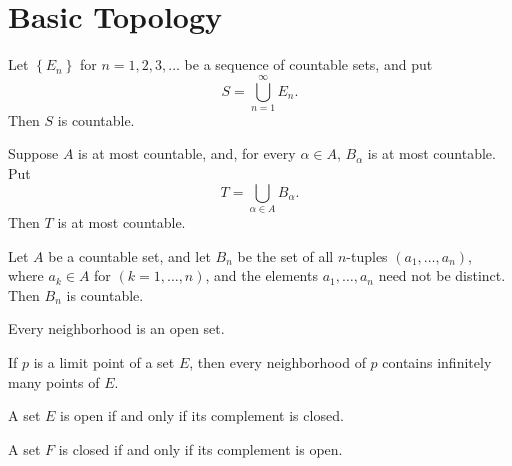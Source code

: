 \chapter{Basic Topology}

\setcounter{theorem}{11}
\begin{theorem}
	\label{theorem-2.12}
	Let $\left\lbrace E_n \right\rbrace$ for $n = 1, 2, 3, \ldots$ be a sequence of countable sets, and put
	\begin{equation}
	S = \bigcup_{n=1}^\infty E_n.
	\end{equation}
	Then $S$ is countable.
\end{theorem}

\begin{corollary}
	\label{theorem-2.12-corollary-1}
	Suppose $A$ is at most countable, and, for every $\alpha \in A$, $B_\alpha$ is at most countable. Put
	\begin{equation*}
	T = \bigcup_{\alpha \in A} B_\alpha.
	\end{equation*}
	Then $T$ is at most countable.
\end{corollary}

\begin{theorem}
	\label{theorem-2.13}
	Let $A$ be a countable set, and let $B_n$ be the set of all $n$-tuples $\left( a_1, \ldots, a_n \right)$, where $a_k \in A$ for $\left( k = 1, \ldots, n \right)$, and the elements $a_1, \ldots, a_n$ need not be distinct. Then $B_n$ is countable.
\end{theorem}

\setcounter{theorem}{18}
\begin{theorem}
	\label{theorem-2.19}
	Every neighborhood is an open set.
\end{theorem}

\begin{theorem}
	\label{theorem-2.20}
	If $p$ is a limit point of a set $E$, then every neighborhood of $p$ contains infinitely many points of $E$.
\end{theorem}

\setcounter{theorem}{22}
\begin{theorem}
	\label{theorem-2.23}
	A set $E$ is open if and only if its complement is closed.
\end{theorem}

\begin{corollary}
	\label{theorem-2.23-corollary-1}
	A set $F$ is closed if and only if its complement is open.
\end{corollary}

